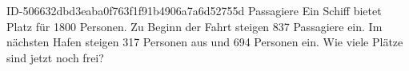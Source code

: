 \begin{exercise}
      {ID-506632dbd3eaba0f763f1f91b4906a7a6d52755d}
      {Passagiere}
  \ifproblem\problem
    Ein Schiff bietet Platz für \num{1800} Personen. Zu Beginn der Fahrt steigen 837
    Passagiere ein. Im nächsten Hafen steigen 317 Personen aus und 694 Personen
    ein. Wie viele Plätze sind jetzt noch frei?
  \fi
\end{exercise}
